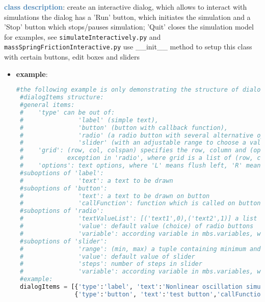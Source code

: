 \begin{itemize}[leftmargin=1.4cm]
\begin{itemize}[leftmargin=0.5cm]
\begin{itemize}[leftmargin=1.4cm]
\begin{itemize}[leftmargin=0.5cm]
\begin{itemize}[leftmargin=1.4cm]
\begin{itemize}[leftmargin=0.5cm]
\begin{itemize}[leftmargin=1.4cm]
\begin{itemize}[leftmargin=1.4cm]
%
\noindent\textcolor{steelblue}{{\bf class description}}:  create an interactive dialog, which allows to interact with simulations
the dialog has a 'Run' button, which initiates the simulation and a 'Stop' button which stops/pauses simulation; 'Quit' closes the simulation model
for examples, see \texttt{simulateInteractively.py} and \texttt{massSpringFrictionInteractive.py}
use \_\_init\_\_ method to setup this class with certain buttons, edit boxes and sliders
\setlength{\itemindent}{0.7cm}
\begin{itemize}[leftmargin=0.7cm]
  \item[--]  {\bf example}: \vspace{-12pt}\ei\begin{lstlisting}[language=Python, xleftmargin=36pt]
#the following example is only demonstrating the structure of dialogItems and plots
 #dialogItems structure:
 #general items:
 #    'type' can be out of:
 #               'label' (simple text),
 #               'button' (button with callback function),
 #               'radio' (a radio button with several alternative options),
 #               'slider' (with an adjustable range to choose a value)
 #    'grid': (row, col, colspan) specifies the row, column and (optionally) the span of columns the item is placed at;
 #            exception in 'radio', where grid is a list of (row, col) for every choice
 #    'options': text options, where 'L' means flush left, 'R' means flush right
 #suboptions of 'label':
 #               'text': a text to be drawn
 #suboptions of 'button':
 #               'text': a text to be drawn on button
 #               'callFunction': function which is called on button-press
 #suboptions of 'radio':
 #               'textValueList': [('text1',0),('text2',1)] a list of texts with according values
 #               'value': default value (choice) of radio buttons
 #               'variable': according variable in mbs.variables, which is set to current radio button value
 #suboptions of 'slider':
 #               'range': (min, max) a tuple containing minimum and maximum value of slider
 #               'value': default value of slider
 #               'steps': number of steps in slider
 #               'variable': according variable in mbs.variables, which is set to current slider value
 #example:
 dialogItems = [{'type':'label', 'text':'Nonlinear oscillation simulator', 'grid':(0,0,2), 'options':['L']},
                {'type':'button', 'text':'test button','callFunction':ButtonCall, 'grid':(1,0,2)},

\end{lstlisting}
\end{itemize}
\end{itemize}
\end{itemize}
\end{itemize}
\end{itemize}
\end{itemize}
\end{itemize}
\end{itemize}
\end{itemize}

